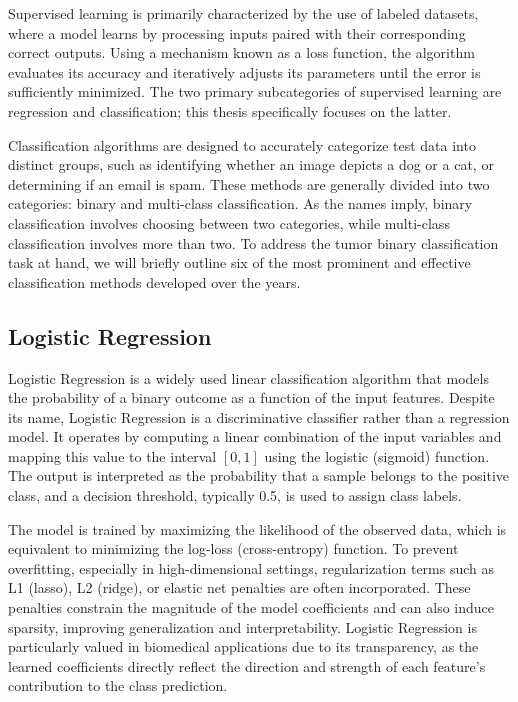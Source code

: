 \documentclass[en]{dimscthesis}
\begin{document}
Supervised learning is primarily characterized by the use of labeled datasets, where a model learns by processing inputs paired with their corresponding correct outputs. Using a mechanism known as a loss function, the algorithm evaluates its accuracy and iteratively adjusts its parameters until the error is sufficiently minimized. The two primary subcategories of supervised learning are regression and classification; this thesis specifically focuses on the latter.

Classification algorithms are designed to accurately categorize test data into distinct groups, such as identifying whether an image depicts a dog or a cat, or determining if an email is spam. These methods are generally divided into two categories: binary and multi-class classification. As the names imply, binary classification involves choosing between two categories, while multi-class classification involves more than two. To address the tumor binary classification task at hand, we will briefly outline six of the most prominent and effective classification methods developed over the years.

\subsection{Logistic Regression} \label{lr}

Logistic Regression \cite{bib:logistic_regression} is a widely used linear classification algorithm that models the probability of a binary outcome as a function of the input features. Despite its name, Logistic Regression is a discriminative classifier rather than a regression model. It operates by computing a linear combination of the input variables and mapping this value to the interval $[0,1]$ using the logistic (sigmoid) function. The output is interpreted as the probability that a sample belongs to the positive class, and a decision threshold, typically 0.5, is used to assign class labels.

The model is trained by maximizing the likelihood of the observed data, which is equivalent to minimizing the log-loss (cross-entropy) function. To prevent overfitting, especially in high-dimensional settings, regularization terms such as L1 (lasso), L2 (ridge), or elastic net penalties are often incorporated. These penalties constrain the magnitude of the model coefficients and can also induce sparsity, improving generalization and interpretability. Logistic Regression is particularly valued in biomedical applications due to its transparency, as the learned coefficients directly reflect the direction and strength of each feature’s contribution to the class prediction.
\end{document}
